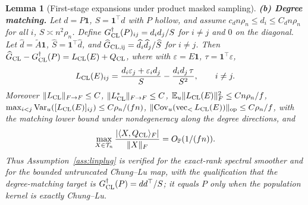 \documentclass[12pt]{article}
\newtheorem{lemma}{Lemma}
\newcommand{\E}{\mathbb{E}}
\newcommand{\1}{\mathbf{1}}
\begin{document}
\begin{lemma}[First-stage expansions under product masked sampling]
\smallskip\noindent\textbf{(b) Degree matching.}
Let $d=P\1$, $S=\1^\top d$ with $P$ hollow, and assume $c_d n\rho_n\le d_i\le C_d n\rho_n$ for all
$i$, $S\asymp n^2\rho_n$. Define $G_{\rm CL}^{\dagger}(P)_{ij}=d_id_j/S$ for $i\ne j$ and $0$ on the
diagonal. Let $\widehat d=\widetilde A\1$, $\widehat S=\1^\top\widehat d$, and $\widehat G_{\rm
CL,ij}=\widehat d_i\widehat d_j/\widehat S$ for $i\ne j$. Then $\widehat G_{\rm CL}-G_{\rm
CL}^{\dagger}(P)=L_{\rm CL}(E)+Q_{\rm CL}$, where with $\varepsilon=E\1$, $\tau=\1^\top\varepsilon$,
\[
        L_{\rm CL}(E)_{ij}=\frac{d_i\varepsilon_j+\varepsilon_i d_j}{S}-\frac{d_id_j\,\tau}{S^2},
        \qquad i\ne j .
\]
Moreover $\|L_{\rm CL}\|_{F\to F}\le C$, $\|L_{\rm CL}^{*}\|_{F\to F}\le C$,
$\E_u\|L_{\rm CL}(E)\|_F^2\le C n\rho_n/f$, $\max_{i<j}{\rm Var}_u([L_{\rm CL}(E)]_{ij})\le
C\rho_n/(fn)$, $\|{\rm Cov}_u({\rm vec}_<\,L_{\rm CL}(E))\|_{\rm op}\le C\rho_n/f$, with the
matching lower bound under nondegeneracy along the degree directions, and
\[
        \max_{X\in\mathcal T_n}\frac{|\langle X,Q_{\rm CL}\rangle_F|}{\|X\|_F}
        =O_{\mathbb P}(1/(fn)).
\]
Thus Assumption~\ref{ass:linplug} is verified for the exact-rank spectral smoother and for the
bounded untruncated Chung--Lu map, with the qualification that the degree-matching target is
$G_{\rm CL}^{\dagger}(P)=dd^\top/S$; it equals $P$ only when the population kernel is exactly
Chung--Lu.
\end{lemma}
\end{document}
